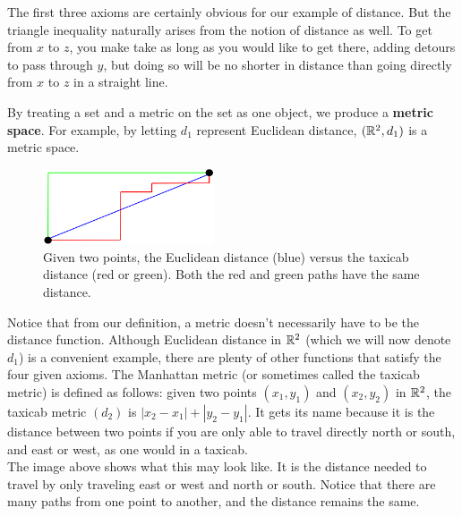 The first three axioms are certainly obvious for our example of distance. But the triangle inequality naturally arises from the notion of distance as well. To get from $x$ to $z$, you make take as long as you would like to get there, adding detours to pass through $y$, but doing so will be no shorter in distance than going directly from $x$ to $z$ in a straight line. \\

\begin{definition}
    By treating a set and a metric on the set as one object, we produce a \textbf{metric space}. For example, by letting $d_1$ represent Euclidean distance, $(\mathbb{R}^2,d_1)$ is a metric space.
\end{definition}
\vspace{3mm}


\begin{figure}
  \begin{center}
    \includegraphics[width=0.45\textwidth]{Images/Chap0/metrics.png}
  \end{center}
  \caption{Given two points, the Euclidean distance (blue) versus the taxicab distance (red or green). Both the red and green paths have the same distance.}
\end{figure}

Notice that from our definition, a metric doesn't necessarily have to be the distance function. Although Euclidean distance in $\mathbb{R}^2$ (which we will now denote $d_1$) is a convenient example, there are plenty of other functions that satisfy the four given axioms. The Manhattan metric (or sometimes called the taxicab metric) is defined as follows: given two points $(x_1,y_1)$ and $(x_2,y_2)$ in $\mathbb{R}^2$, the taxicab metric $(d_2)$ is $|x_2-x_1|+|y_2-y_1|$. It gets its name because it is the distance between two points if you are only able to travel directly north or south, and east or west, as one would in a taxicab. \\

The image above shows what this may look like. It is the distance needed to travel by only traveling east or west and north or south. Notice that there are many paths from one point to another, and the distance remains the same. \\

